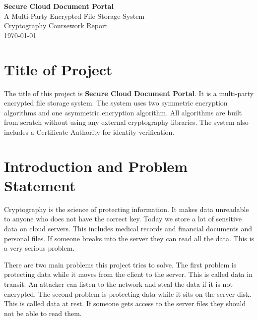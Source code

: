 \documentclass[12pt,a4paper]{article}
\begin{document}
\begin{titlepage}
\centering
\vspace*{3cm}
{\Huge\bfseries Secure Cloud Document Portal}\\[0.5cm]
{\Large A Multi-Party Encrypted File Storage System}\\[1.5cm]
{\large Cryptography Coursework Report}\\[2cm]
{\large\today}
\vfill
\end{titlepage}

\tableofcontents
\newpage


\section{Title of Project}

The title of this project is \textbf{Secure Cloud Document Portal}. It is a multi-party encrypted file storage system. The system uses two symmetric encryption algorithms and one asymmetric encryption algorithm. All algorithms are built from scratch without using any external cryptography libraries. The system also includes a Certificate Authority for identity verification.


\section{Introduction and Problem Statement}

Cryptography is the science of protecting information. It makes data unreadable to anyone who does not have the correct key. Today we store a lot of sensitive data on cloud servers. This includes medical records and financial documents and personal files. If someone breaks into the server they can read all the data. This is a very serious problem.

There are two main problems this project tries to solve. The first problem is protecting data while it moves from the client to the server. This is called data in transit. An attacker can listen to the network and steal the data if it is not encrypted. The second problem is protecting data while it sits on the server disk. This is called data at rest. If someone gets access to the server files they should not be able to read them.
\end{document}
